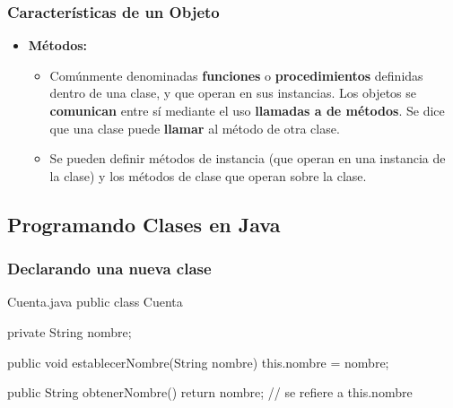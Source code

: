 \documentclass{beamer}
\begin{document}
\begin{frame}
  \frametitle{Características de un Objeto}

  \begin{itemize}
  \item \textbf{Métodos:}
    \begin{itemize}

    \item[] Comúnmente denominadas \textbf{funciones} o
      \textbf{procedimientos} definidas dentro de una clase, y que
      operan en sus instancias. Los objetos se \textbf{comunican}
      entre sí mediante el uso \textbf{llamadas a de métodos}. Se dice
      que una clase puede \textbf{llamar} al método de otra clase.
      
    \item[] Se pueden definir métodos de instancia (que operan en una
      instancia de la clase) y los métodos de clase que operan sobre
      la clase.
      
    \end{itemize}
  \end{itemize}
\end{frame}

\subsection{Programando Clases en Java}

\begin{frame}[fragile]
  \frametitle{Declarando una nueva clase}

    \begin{java}[autogobble]{Cuenta.java}
        public class Cuenta {
          
          private String nombre;

          public void
          establecerNombre(String nombre) {
            this.nombre = nombre;
          }

          public String obtenerNombre() {
            return nombre;
            // se refiere a this.nombre
          }
        }
      \end{java}
\end{frame}
\end{document}
